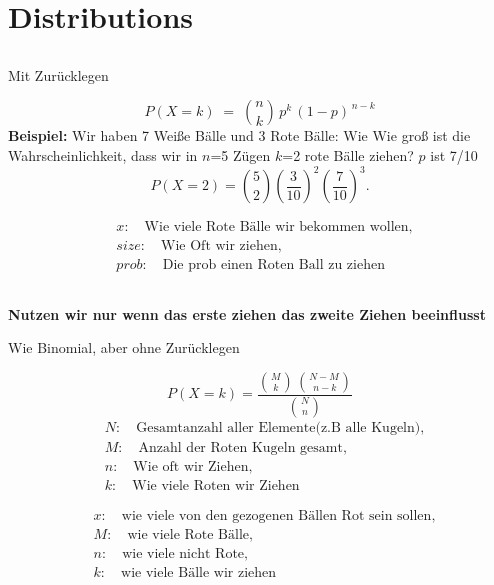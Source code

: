 \section{Distributions}

\subsection*{\centering{}}
\begin{center}
\textcolor{red}{\warning}\textcolor{red}{\warning} Mit Zurücklegen \textcolor{red}{\warning}\textcolor{red}{\warning}
\end{center}
\[ 
P(X = k) \;=\; \binom{n}{k}\,p^k\,(1-p)^{\,n-k} 
\]
\large{\textbf{Beispiel:}}
\normalsize
Wir haben 7 Weiße Bälle und 3 Rote Bälle:
Wie Wie groß ist die Wahrscheinlichkeit, dass wir in $n$=5 Zügen $k$=2 rote Bälle ziehen? $p$ ist 7/10
\[
P(X = 2) = \binom{5}{2} \left(\frac{3}{10}\right)^2 \left(\frac{7}{10}\right)^3.
\]
\[
    \begin{aligned}
    &x:\quad \text{Wie viele Rote Bälle wir bekommen wollen},\\
    &size:\quad \text{Wie Oft wir ziehen},\\
    &prob:\quad \text{Die prob einen Roten Ball zu ziehen}
    \end{aligned}
\]
\subsection*{\centering{}}
\textcolor{red}{\warning}\textcolor{red}{\warning}
\textbf{Nutzen wir nur wenn das erste ziehen das zweite Ziehen beeinflusst}\textcolor{red}{\warning}\textcolor{red}{\warning}
\begin{center}
\textcolor{red}{\warning}\textcolor{red}{\warning} Wie Binomial, aber ohne Zurücklegen \textcolor{red}{\warning}\textcolor{red}{\warning}
\end{center}
\[
P(X = k) 
= \frac{\binom{M}{k}\,\binom{N - M}{\,n - k}}{\binom{N}{n}}
\]
\normalsize
\[
\begin{aligned}
&N:\quad \text{Gesamtanzahl aller Elemente(z.B alle Kugeln)},\\
&M:\quad \text{Anzahl der Roten Kugeln gesamt},\\
&n:\quad \text{Wie oft wir Ziehen},\\
&k:\quad \text{Wie viele Roten wir Ziehen}
\end{aligned}
\]
\normalsize
\[
\begin{aligned}
&x:\quad \text{wie viele von den gezogenen Bällen Rot sein sollen},\\
&M:\quad \text{wie viele Rote Bälle},\\
&n:\quad \text{wie viele nicht Rote},\\
&k:\quad \text{wie viele Bälle wir ziehen}
\end{aligned}
\]
\columnbreak
